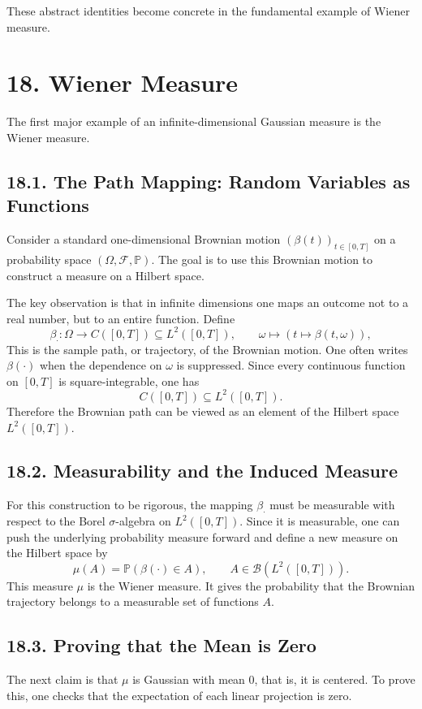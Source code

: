 \documentclass[11pt]{article}
\theoremstyle{definition}
\theoremstyle{remark}
\begin{document}
These abstract identities become concrete in the fundamental example of Wiener measure.

\section*{18. Wiener Measure}
The first major example of an infinite-dimensional Gaussian measure is the Wiener measure.

\subsection*{18.1. The Path Mapping: Random Variables as Functions}
Consider a standard one-dimensional Brownian motion $(\beta(t))_{t\in[0,T]}$ on a probability space $(\Omega,\mathcal F,\mathbb P)$. The goal is to use this Brownian motion to construct a measure on a Hilbert space.

The key observation is that in infinite dimensions one maps an outcome not to a real number, but to an entire function. Define
\[
\beta_{\cdot}:\Omega\to C([0,T])\subseteq L^2([0,T]),
\qquad
\omega\mapsto (t\mapsto \beta(t,\omega)),
\]
This is the sample path, or trajectory, of the Brownian motion. One often writes $\beta(\cdot)$ when the dependence on $\omega$ is suppressed. Since every continuous function on $[0,T]$ is square-integrable, one has
\[
C([0,T])\subseteq L^2([0,T]).
\]
Therefore the Brownian path can be viewed as an element of the Hilbert space $L^2([0,T])$.

\subsection*{18.2. Measurability and the Induced Measure}
For this construction to be rigorous, the mapping $\beta_{\cdot}$ must be measurable with respect to the Borel $\sigma$-algebra on $L^2([0,T])$. Since it is measurable, one can push the underlying probability measure forward and define a new measure on the Hilbert space by
\[
\mu(A)=\mathbb P(\beta(\cdot)\in A),
\qquad
A\in \mathcal B(L^2([0,T])).
\]
This measure $\mu$ is the Wiener measure. It gives the probability that the Brownian trajectory belongs to a measurable set of functions $A$.

\subsection*{18.3. Proving that the Mean is Zero}
The next claim is that $\mu$ is Gaussian with mean $0$, that is, it is centered. To prove this, one checks that the expectation of each linear projection is zero.
\end{document}
